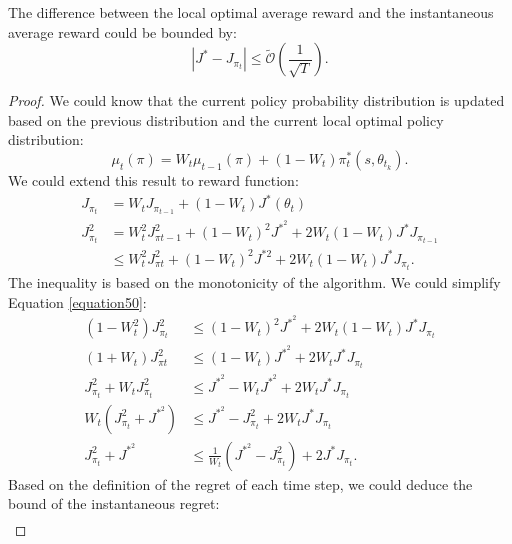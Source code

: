 \begin{lemma}
\label{lemma3.3replacement}
The difference between the local optimal average reward and the instantaneous average reward could be bounded by:
$$
|J^{*} - J_{\pi_{t}}| \leq \tilde{\mathcal{O}}(\frac{1}{\sqrt{T}}).
$$
\begin{proof}
We could know that the current policy probability distribution is updated based on the previous distribution and the current local optimal policy distribution:
\begin{equation}
\mu_{t}(\pi) = W_{t}\mu_{t-1}(\pi) + (1-W_{t})\pi_{t}^{*}(s,\theta_{t_{k}}).
\end{equation}
We could extend this result to reward function:
\begin{equation}
\label{equation50}
\begin{aligned}
J_{\pi_{t}}&=W_{t} J_{\pi_{t-1}}+\left(1-W_{t}\right) J^{*}\left(\theta_{t}\right)\\
J_{\pi_{t}}^{2} &=W_{t}^{2} J_{\pi{t-1}}^{2}+\left(1-W_{t}\right)^{2} J^{*^{2}}+2 W_{t}\left(1-W_{t}\right) J^{*} J_{\pi_{t-1}} \\
& \leq W_{t}^{2} J_{\pi t}^{2}+\left(1-W_{t}\right)^{2} J^{* 2}+2 W_{t}\left(1-W_{t}\right) J^{*} J_{\pi_{t}}.
\end{aligned}
\end{equation}
The inequality is based on the monotonicity of the algorithm. We could simplify Equation \ref{equation50}:
\begin{equation}
\begin{aligned}
\left(1-W_{t}^{2}\right) J_{\pi_{t}}^{2} &\leq \left(1-W_{t}\right)^{2} J^{*^{2}}+2 W_{t}\left(1-W_{t}\right) J^{*} J_{\pi_{t}} \\
\left(1+W_{t}\right) J_{\pi t}^{2} &\leq \left(1-W_{t}\right) J^{*^{2}}+2 W_{t} J^{*} J_{\pi_{t}} \\
J_{\pi_{t}}^{2}+W_{t} J_{\pi_{t}}^{2} &\leq J^{*^{2}}-W_{t} J^{*^{2}}+2 W_{t} J^{*} J_{\pi_{t}}\\
W_{t}\left(J_{\pi_{t}}^{2}+J^{*^{2}}\right) &\leq J^{*^{2}}-J_{\pi_{t}}^{2}+2 W_{t} J^{*} J_{\pi_{t}}\\
J_{\pi_{t}}^{2}+J^{*^{2}} &\leq \frac{1}{W_{t}}\left(J^{*^{2}}-J_{\pi_{t}}^{2}\right)+2 J^{*} J_{\pi_{t}}.
\end{aligned}
\end{equation}
Based on the definition of the regret of each time step, we could deduce the bound of the instantaneous regret:
\begin{equation}
\begin{aligned}

\end{aligned}
\end{equation}
\end{proof}
\end{lemma}
